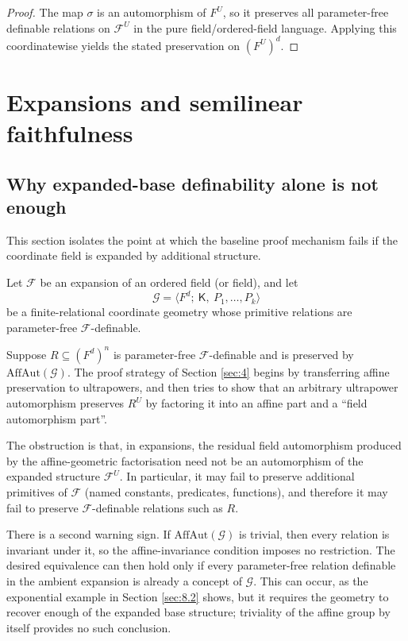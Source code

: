 \documentclass[11pt,a4paper]{article}
\newcommand{\G}{\mathcal{G}}
\newcommand{\F}{\mathcal{F}}
\theoremstyle{definition}
\begin{document}
\begin{proof}
	The map $\sigma$ is an automorphism of $F^U$, so it
preserves all parameter-free definable relations on $\F^U$ in the pure
field/ordered-field language. Applying this coordinatewise yields the
stated preservation on $(F^U)^d$.
\end{proof}



\section{Expansions and semilinear faithfulness}
\label{sec:5}


\subsection{Why expanded-base definability alone is not enough}
\label{sec:5.1}

This section isolates the point at which the baseline proof mechanism
fails if the coordinate field is expanded by additional structure.

Let $\F$ be an expansion of an ordered field (or field), and
let \[
\G=\langle F^d;\ \mathsf K,\ P_1,\dots,P_k\rangle
\] be a finite-relational coordinate geometry whose primitive relations
are parameter-free $\F$-definable.

Suppose $R\subseteq (F^d)^n$ is parameter-free
$\F$-definable and is preserved by $\mathrm{AffAut}(\G)$. The
proof strategy of Section \ref{sec:4} begins by transferring affine preservation to
ultrapowers, and then tries to show that an arbitrary ultrapower
automorphism preserves $R^U$ by factoring it into an affine part and a
``field automorphism part''.

The obstruction is that, in expansions, the residual field automorphism
produced by the affine-geometric factorisation need not be an
automorphism of the expanded structure $\F^U$. In particular,
it may fail to preserve additional primitives of $\F$ (named
constants, predicates, functions), and therefore it may fail to preserve
$\F$-definable relations such as $R$.

There is a second warning sign. If $\mathrm{AffAut}(\G)$ is trivial,
then every relation is invariant under it, so the affine-invariance
condition imposes no restriction. The desired equivalence can then hold
only if every parameter-free relation definable in the ambient expansion
is already a concept of $\G$. This can occur, as the exponential
example in Section \ref{sec:8.2} shows, but it requires the geometry to recover enough of
the expanded base structure; triviality of the affine group by itself
provides no such conclusion.
\end{document}
